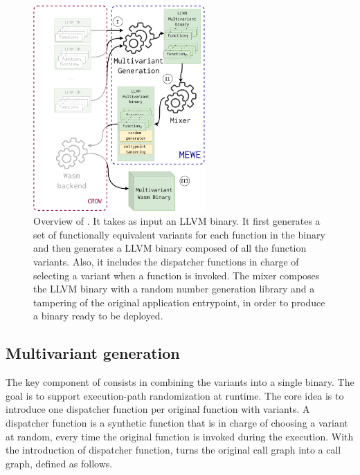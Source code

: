 
\begin{figure}
  \centering
  \includegraphics[height=3.1in]{diagrams/MEWE.pdf}
  \caption{Overview of \tool. It takes as input an LLVM binary. It first generates a set of functionally equivalent variants for each function in the binary and then generates a LLVM binary composed of all the function variants. Also, it includes the dispatcher functions in charge of selecting a variant when a function is invoked. The \tool mixer composes the LLVM binary with a random number generation library and a tampering of the original application entrypoint, in order to produce a \wasm {}binary ready to be deployed. }
  \label{workflow}
\end{figure}


\subsection*{Multivariant generation}

The key component of \tool consists in combining the variants into a single binary.
The goal is to support execution-path randomization at runtime.
The core idea is to introduce one dispatcher function per original function with variants.
A dispatcher function is a synthetic function that is in charge of choosing a variant at random, every time the original function is invoked during the execution.
With the introduction of dispatcher function,  \tool turns the original call graph into a call graph, defined as follows. 

